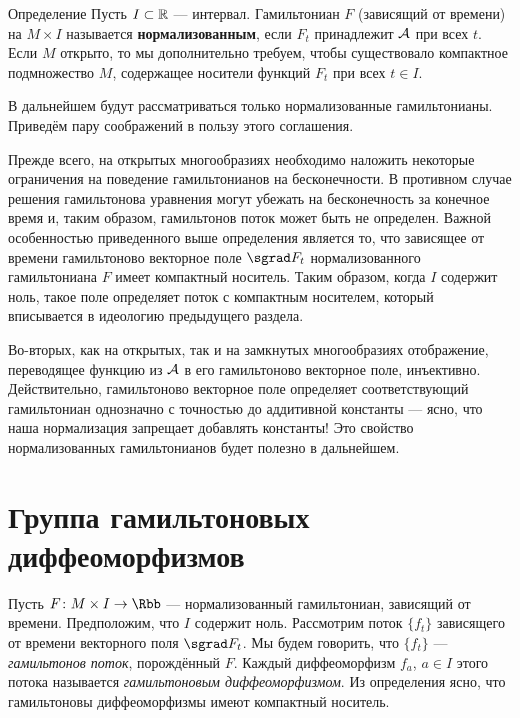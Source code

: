 \begin{ex}{Определение}
Пусть $I \subset \mathbb{R}$ — интервал.
Гамильтониан $F$ (зависящий от времени) на $M \times I$ называется \textbf{нормализованным}, если $F_t$ принадлежит $\mathcal{A}$ при всех $t$.
Если $M$ открыто, то мы дополнительно требуем, чтобы существовало компактное подмножество $M$, содержащее носители функций $F_t$ при всех $t \in I$.
\end{ex}

В дальнейшем будут рассматриваться только нормализованные гамильтонианы.
Приведём пару соображений в пользу этого соглашения.

Прежде всего, на открытых многообразиях необходимо наложить некоторые ограничения на поведение гамильтонианов на бесконечности.
В противном случае решения гамильтонова уравнения могут
убежать на бесконечность за конечное время и, таким образом, гамильтонов поток может быть не определен.
Важной особенностью приведенного выше определения является то, что зависящее от времени гамильтоново векторное поле $\sgrad F_t$ нормализованного гамильтониана $F$ имеет компактный носитель.
Таким образом, когда $I$ содержит ноль, такое поле определяет поток с компактным носителем, который вписывается в идеологию предыдущего раздела.

Во-вторых, как на открытых, так и на замкнутых многообразиях отображение, переводящее функцию из $\mathcal{A}$ в его гамильтоново векторное поле, инъективно.
Действительно, гамильтоново векторное поле определяет соответствующий гамильтониан однозначно с точностью до аддитивной константы — ясно, что наша нормализация запрещает добавлять константы!
Это свойство нормализованных гамильтонианов будет полезно в дальнейшем.

\section[Группа гамильтоновых диффеоморфизмов]{Группа гамильтоновых\\диффеоморфизмов}\label{1.4}

Пусть $F\: M \times I \to \Rbb$ — нормализованный гамильтониан, зависящий от времени.
Предположим, что $I$ содержит ноль.
Рассмотрим поток $\{f_t\}$ зависящего от времени векторного поля $\sgrad F_t$.
Мы будем говорить, что $\{f_t\}$ — \emph{гамильтонов поток}, порождённый $F$.
Каждый диффеоморфизм $f_a$, $a \in I$ этого потока называется \emph{гамильтоновым диффеоморфизмом}.
Из определения ясно, что гамильтоновы диффеоморфизмы имеют компактный носитель.

